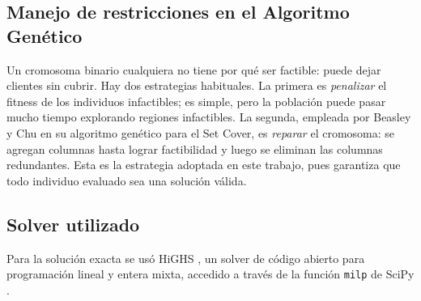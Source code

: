 \subsection{Manejo de restricciones en el Algoritmo Genético}
Un cromosoma binario cualquiera no tiene por qué ser factible: puede dejar clientes sin cubrir. Hay dos estrategias habituales. La primera es \textit{penalizar} el fitness de los individuos infactibles; es simple, pero la población puede pasar mucho tiempo explorando regiones infactibles. La segunda, empleada por Beasley y Chu \cite{beasley96} en su algoritmo genético para el Set Cover, es \textit{reparar} el cromosoma: se agregan columnas hasta lograr factibilidad y luego se eliminan las columnas redundantes. Esta es la estrategia adoptada en este trabajo, pues garantiza que todo individuo evaluado sea una solución válida.

\subsection{Solver utilizado}
Para la solución exacta se usó HiGHS \cite{highs18}, un solver de código abierto para programación lineal y entera mixta, accedido a través de la función \texttt{milp} de SciPy \cite{scipy20}.
